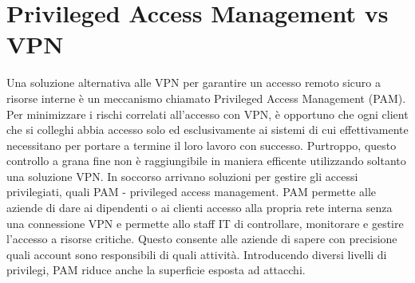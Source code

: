 \section{Privileged Access Management vs VPN}
Una soluzione alternativa alle VPN per garantire un accesso remoto sicuro a risorse interne è un meccanismo chiamato Privileged Access Management (PAM).
Per minimizzare i rischi correlati all'accesso con VPN, è opportuno che ogni client che si colleghi abbia accesso solo ed esclusivamente ai sistemi di cui effettivamente necessitano per portare a termine il loro lavoro con successo.
Purtroppo, questo controllo a grana fine non è raggiungibile in maniera efficente utilizzando soltanto una soluzione VPN. In soccorso arrivano soluzioni per gestire gli accessi privilegiati, quali PAM - privileged access management.
PAM permette alle aziende di dare ai dipendenti o ai clienti accesso alla propria rete interna senza una connessione VPN e permette allo staff IT di controllare, monitorare e gestire l'accesso a risorse critiche. Questo consente alle aziende di sapere con precisione quali account sono responsibili di quali attività.
Introducendo diversi livelli di privilegi, PAM riduce anche la superficie esposta ad attacchi.

